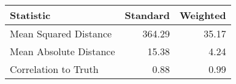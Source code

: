 \begin{tabular}{lrr}
  \hline
Statistic & Standard & Weighted \\ 
  \hline
Mean Squared Distance & 364.29 & 35.17 \\ 
  Mean Absolute Distance & 15.38 & 4.24 \\ 
  Correlation to Truth & 0.88 & 0.99 \\ 
   \hline
\end{tabular}
